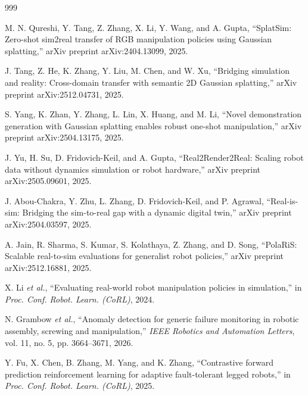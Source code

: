 ﻿\documentclass[12pt,a4paper,oneside]{report}
\begin{document}
\begin{thebibliography}{999}

M. N. Qureshi, Y. Tang, Z. Zhang, X. Li, Y. Wang, and A. Gupta, ``{SplatSim}: Zero-shot sim2real transfer of {RGB} manipulation policies using Gaussian splatting,'' arXiv preprint arXiv:2404.13099, 2025.


J. Tang, Z. He, K. Zhang, Y. Liu, M. Chen, and W. Xu, ``Bridging simulation and reality: Cross-domain transfer with semantic 2D Gaussian splatting,'' arXiv preprint arXiv:2512.04731, 2025.


S. Yang, K. Zhan, Y. Zhang, L. Lin, X. Huang, and M. Li, ``Novel demonstration generation with Gaussian splatting enables robust one-shot manipulation,'' arXiv preprint arXiv:2504.13175, 2025.


J. Yu, H. Su, D. Fridovich-Keil, and A. Gupta, ``{Real2Render2Real}: Scaling robot data without dynamics simulation or robot hardware,'' arXiv preprint arXiv:2505.09601, 2025.


J. Abou-Chakra, Y. Zhu, L. Zhang, D. Fridovich-Keil, and P. Agrawal, ``Real-is-sim: Bridging the sim-to-real gap with a dynamic digital twin,'' arXiv preprint arXiv:2504.03597, 2025.


A. Jain, R. Sharma, S. Kumar, S. Kolathaya, Z. Zhang, and D. Song, ``{PolaRiS}: Scalable real-to-sim evaluations for generalist robot policies,'' arXiv preprint arXiv:2512.16881, 2025.


X. Li \textit{et al.}, ``Evaluating real-world robot manipulation policies in simulation,'' in \textit{Proc. Conf. Robot. Learn. (CoRL)}, 2024.


N. Grambow \textit{et al.}, ``Anomaly detection for generic failure monitoring in robotic assembly, screwing and manipulation,'' \textit{IEEE Robotics and Automation Letters}, vol. 11, no. 5, pp. 3664--3671, 2026.


Y. Fu, X. Chen, B. Zhang, M. Yang, and K. Zhang, ``Contrastive forward prediction reinforcement learning for adaptive fault-tolerant legged robots,'' in \textit{Proc. Conf. Robot. Learn. (CoRL)}, 2025.


\end{thebibliography}
\end{document}
